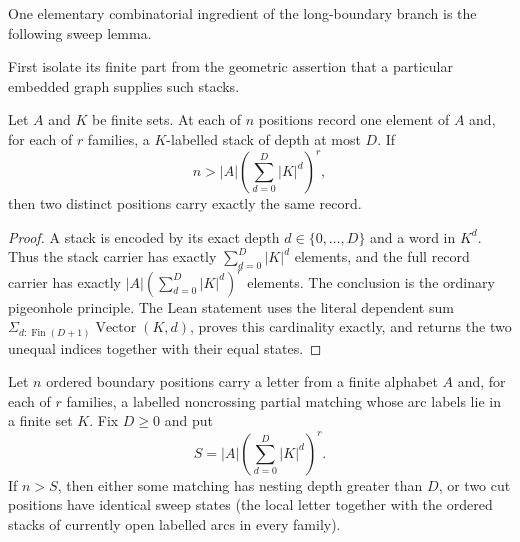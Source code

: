 One elementary combinatorial ingredient of the long-boundary branch is the
following sweep lemma.

First isolate its finite part from the geometric assertion that a particular
embedded graph supplies such stacks.

\begin{lemma}
\label{lem:bounded-stack-sweep-pigeonhole}
Let $A$ and $K$ be finite sets.  At each of $n$ positions record one element
of $A$ and, for each of $r$ families, a $K$-labelled stack of depth at most
$D$.  If
\[
 n>|A|\left(\sum_{d=0}^{D}|K|^d\right)^r,
\]
then two distinct positions carry exactly the same record.
\end{lemma}

\begin{proof}
A stack is encoded by its exact depth $d\in\{0,\ldots,D\}$ and a word in
$K^d$.  Thus the stack carrier has exactly
$\sum_{d=0}^{D}|K|^d$ elements, and the full record carrier has exactly
$|A|(\sum_{d=0}^{D}|K|^d)^r$ elements.  The conclusion is the ordinary
pigeonhole principle.  The Lean statement uses the literal dependent sum
$\Sigma_{d:\operatorname{Fin}(D+1)}\operatorname{Vector}(K,d)$, proves this
cardinality exactly, and returns the two unequal indices together with their
equal states.
\end{proof}

\begin{lemma}
\label{lem:noncrossing-length-depth}
Let $n$ ordered boundary positions carry a letter from a finite alphabet $A$
and, for each of $r$ families, a labelled noncrossing partial matching whose
arc labels lie in a finite set $K$.  Fix $D\ge0$ and put
\[
 S=|A|\left(\sum_{d=0}^{D}|K|^d\right)^r.
\]
If $n>S$, then either some matching has nesting depth greater than $D$, or two
cut positions have identical sweep states (the local letter together with the
ordered stacks of currently open labelled arcs in every family).
\end{lemma}

